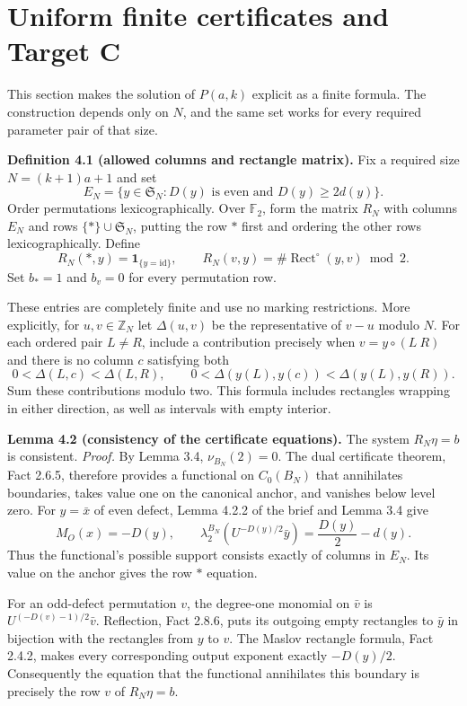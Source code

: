 \documentclass[11pt,a4paper]{article}
\begin{document}
\section{Uniform finite certificates and Target C}

This section makes the solution of $P(a,k)$ explicit as a finite formula.
The construction depends only on $N$, and the same set works for every
required parameter pair of that size.

\textbf{Definition 4.1 (allowed columns and rectangle matrix).}
Fix a required size $N=(k+1)a+1$ and set
\[
E_N=\{y\in\mathfrak S_N:D(y)\text{ is even and }D(y)\ge2d(y)\}.
\]
Order permutations lexicographically. Over $\mathbb F_2$, form the matrix
$R_N$ with columns $E_N$ and rows $\{*\}\cup\mathfrak S_N$, putting
the row $*$ first and ordering the other rows lexicographically. Define
\[
R_N(*,y)=\mathbf1_{\{y=\mathrm{id}\}},\qquad
R_N(v,y)=\#\operatorname{Rect}^{\circ}(y,v)\bmod2.
\]
Set $b_*=1$ and $b_v=0$ for every permutation row.

These entries are completely finite and use no marking restrictions.
More explicitly, for $u,v\in\mathbb Z_N$ let $\Delta(u,v)$ be the
representative of $v-u$ modulo $N$. For each ordered pair $L\ne R$,
include a contribution precisely when $v=y\circ(L\ R)$ and there is
no column $c$ satisfying both
\[
0<\Delta(L,c)<\Delta(L,R),\qquad
0<\Delta(y(L),y(c))<\Delta(y(L),y(R)).
\]
Sum these contributions modulo two. This formula includes rectangles
wrapping in either direction, as well as intervals with empty interior.

\textbf{Lemma 4.2 (consistency of the certificate equations).}
The system $R_N\eta=b$ is consistent.
\textit{Proof.}
By Lemma 3.4, $\nu_{B_N}(2)=0$. The dual certificate theorem, Fact 2.6.5,
therefore provides a functional on $C_0(B_N)$ that annihilates boundaries,
takes value one on the canonical anchor, and vanishes below level zero.
For $y=\bar x$ of even defect, Lemma 4.2.2 of the brief and Lemma 3.4 give
\[
M_O(x)=-D(y),\qquad
\lambda_2^{B_N}(U^{-D(y)/2}\bar y)=\frac{D(y)}{2}-d(y).
\]
Thus the functional's possible support consists exactly of columns in
$E_N$. Its value on the anchor gives the row $*$ equation.

For an odd-defect permutation $v$, the degree-one monomial on $\bar v$
is $U^{(-D(v)-1)/2}\bar v$. Reflection, Fact 2.8.6, puts its outgoing
empty rectangles to $\bar y$ in bijection with the rectangles from
$y$ to $v$. The Maslov rectangle formula, Fact 2.4.2, makes every
corresponding output exponent exactly $-D(y)/2$. Consequently the
equation that the functional annihilates this boundary is precisely
the row $v$ of $R_N\eta=b$.
\end{document}
